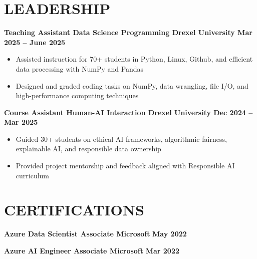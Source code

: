 \documentclass[10pt]{article}
\begin{document}
\section*{LEADERSHIP}
\vspace{-0.1cm}

\noindent
\textbf{Teaching Assistant \textbar{} Data Science Programming \textbar{} Drexel University  \hfill Mar 2025 -- June 2025} \\
\vspace{-0.4cm}
\begin{itemize}[leftmargin=0.6cm, itemsep=-0.1cm, topsep=0cm]

    \item Assisted instruction for 70+ students in Python, Linux, Github, and efficient data processing with NumPy and Pandas

    \item Designed and graded coding tasks on  NumPy, data wrangling, file I/O, and high-performance computing techniques

\end{itemize}

\noindent
\textbf{Course Assistant \textbar{} Human-AI Interaction \textbar{} Drexel University  \hfill Dec 2024 -- Mar 2025} \\
\vspace{-0.4cm}
\begin{itemize}[leftmargin=0.6cm, itemsep=-0.1cm, topsep=0cm]

    \item Guided 30+ students on ethical AI frameworks, algorithmic fairness, explainable AI, and responsible data ownership

    \item Provided project mentorship and feedback aligned with Responsible AI curriculum

\end{itemize}



\vspace{-0.4cm} 
\section*{CERTIFICATIONS} 
\vspace{-0.2cm}

\noindent
\textbf{Azure Data Scientist Associate \textbar{} Microsoft } \hfill \textbf{May 2022 }

\noindent
\textbf{Azure AI Engineer Associate \textbar{} Microsoft } \hfill \textbf{Mar 2022 }
\end{document}

